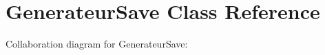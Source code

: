 \hypertarget{classGenerateurSave}{}\section{Generateur\+Save Class Reference}
\label{classGenerateurSave}


Collaboration diagram for Generateur\+Save\+:
